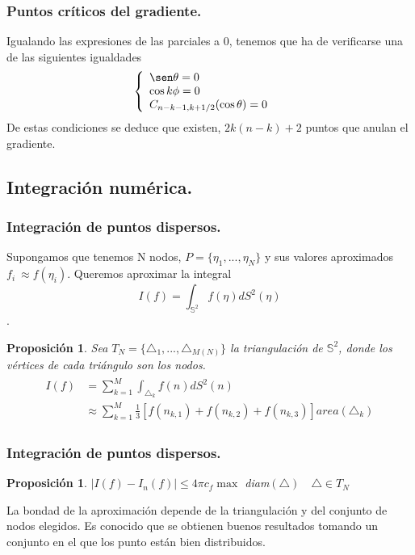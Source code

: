 \documentclass{beamer}
\theoremstyle{plain}
\theoremstyle{definition}
\theoremstyle{plain}
\newtheorem{prop}[thm]{Proposici\'{o}n}
\theoremstyle{definition}
\theoremstyle{remark}
\theoremstyle{definition}
\begin{document}
\begin{frame}
	\frametitle{Puntos críticos del gradiente.}

	Igualando las expresiones de las parciales a 0, tenemos que ha de verificarse una de las siguientes igualdades
	\begin{gather*}
	\left\{
	\begin{array}{ll}
	\sen \theta= 0 \\
	\cos k\phi = 0 &\\
	C_{n-k-1,k+1/2}(\cos \theta) = 0
	\end{array}
	\right.
	\end{gather*}
	De estas condiciones se deduce que existen, $2k(n-k)+2$ puntos que anulan el gradiente.
\end{frame}
\subsection{Integración numérica.}
\begin{frame}
	\tableofcontents[currentsubsection]
\end{frame}
\begin{frame}
	\frametitle{Integración de puntos dispersos.}
	Supongamos que tenemos N nodos, $P=\{\eta_1,...,\eta_N\}$ y sus valores aproximados $f_i~\approx f(\eta_i)$. Queremos aproximar la integral $$I(f) =  \int_{\mathds{S}^2} f(\eta)dS^2(\eta)$$.
	\begin{prop}
		Sea $T_N=\{\triangle_1,...,\triangle_{M(N)}\}$ la triangulación de $\mathds{S}^2$, donde los vértices de cada triángulo son los nodos.
		\begin{gather*}
		\begin{aligned}
			I(f) &= \sum_{k=1}^{M} \int_{\triangle_k} f(n)dS^2(n) \\& \approx  \sum_{k=1}^{M} \frac{1}{3}[f(n_{k,1})+f(n_{k,2})+f(n_{k,3})] area(\triangle_k)
		\end{aligned}
		\end{gather*}
	\end{prop}
\end{frame}
\begin{frame}
		\frametitle{Integración de puntos dispersos.}
		\begin{prop}
			$|I(f)-I_n(f)|\le 4\pi c_f \max$ diam$(\triangle) \quad \triangle\in T_N$
		\end{prop}
	La bondad de la aproximación depende de la triangulación y del conjunto de nodos elegidos.
	Es conocido que se obtienen buenos resultados tomando un conjunto en el que los punto están bien distribuidos.
\end{frame}
\end{document}
